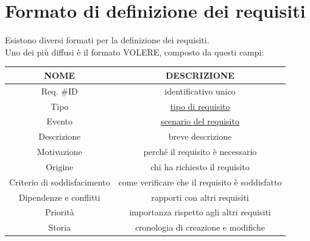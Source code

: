 \newpage
\section{Formato di definizione dei requisiti}
Esistono diversi formati per la definizione dei requisiti. \\
Uno dei più diffusi è il formato VOLERE, composto da questi campi:
\begin{table}[h]
    \centering
    \begin{tabular}{| c | c |}
    \hline
    \textbf{NOME} & \textbf{DESCRIZIONE} \\
    \hline
    Req. $\#$ID & identificativo unico \\
    Tipo & \hyperref[sector:req-types]{tipo di requisito} \\
    Evento & \hyperref[subsector:scenari]{scenario del requisito} \\
    Descrizione & breve descrizione \\
    Motivazione & perché il requisito è necessario \\
    Origine & chi ha richiesto il requisito \\
    Criterio di soddisfacimento & come verificare che il requisito è soddisfatto \\ 
    Dipendenze e conflitti & rapporti con altri requisiti \\
    Priorità & importanza rispetto agli altri requisiti \\
    Storia & cronologia di creazione e modifiche \\
    \hline
    \end{tabular}
    \label{tab:VOLERE}
\end{table}